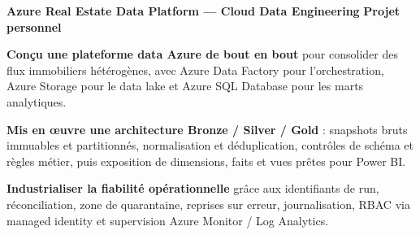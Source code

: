 {\fontsize{8.36}{9.14}\selectfont

\textbf{Azure Real Estate Data Platform --- Cloud Data Engineering}
\hfill\textcolor{steel}{\bfseries Projet personnel}\par

\begin{cvitems}

\item \textbf{Conçu une plateforme data Azure de bout en bout} pour consolider des flux immobiliers hétérogènes, avec Azure Data Factory pour l'orchestration, Azure Storage pour le data lake et Azure SQL Database pour les marts analytiques.

\item \textbf{Mis en œuvre une architecture Bronze / Silver / Gold} : snapshots bruts immuables et partitionnés, normalisation et déduplication, contrôles de schéma et règles métier, puis exposition de dimensions, faits et vues prêtes pour Power BI.

\item \textbf{Industrialiser la fiabilité opérationnelle} grâce aux identifiants de run, réconciliation, zone de quarantaine, reprises sur erreur, journalisation, RBAC via managed identity et supervision Azure Monitor / Log Analytics.

\end{cvitems}}
